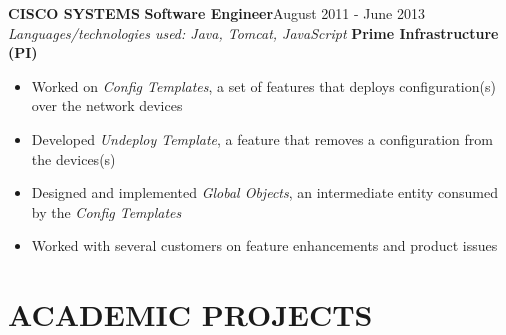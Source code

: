 \documentclass[10pt, letterpaper]{article}
\begin{document}
\begin{multicols}{2}
			\columnbreak 
			{\bfseries CISCO SYSTEMS}\newline
			{\bfseries \small Software Engineer}\hfill{August 2011 - June 2013}\newline			
				\textit{Languages/technologies used: Java, Tomcat, JavaScript}\newline
				{\bfseries Prime Infrastructure (PI)}
				\begin{itemize}[nolistsep,leftmargin=*]
					\item Worked on \textit{Config Templates}, a set of features that deploys configuration(s) over the network devices
					\item Developed \textit{Undeploy Template}, a feature that removes a configuration from the devices(s)
					\item Designed and implemented \textit{Global Objects}, an intermediate entity consumed by the \textit{Config Templates}
					\item Worked with several customers on feature enhancements and product issues
				\end{itemize}
				

		\section*{ACADEMIC PROJECTS}
			

\end{multicols}
\end{document}
